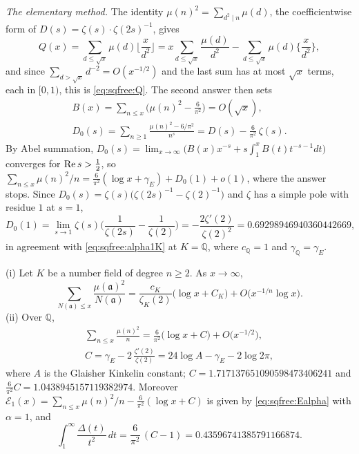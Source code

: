\emph{The elementary method.} The identity $\mu(n)^2=\sum_{d^2\mid n}\mu(d)$, the coefficientwise form of $D(s)=\zeta(s)\cdot\zeta(2s)^{-1}$, gives
\begin{equation}\label{eq:sqfree:Qd}
Q(x)=\sum_{d\le\sqrt x}\mu(d)\Big\lfloor\frac x{d^2}\Big\rfloor=x\sum_{d\le\sqrt x}\frac{\mu(d)}{d^2}-\sum_{d\le\sqrt x}\mu(d)\Big\{\frac x{d^2}\Big\},
\end{equation}
and since $\sum_{d>\sqrt x}d^{-2}=O(x^{-1/2})$ and the last sum has at most $\sqrt x$ terms, each in $[0,1)$, this is \eqref{eq:sqfree:Q}. The second answer then sets
\begin{gather*}
B(x)=\sum_{n\le x}\Big(\mu(n)^2-\frac6{\pi^2}\Big)=O(\sqrt x),\\
D_0(s)=\sum_{n\ge1}\frac{\mu(n)^2-6/\pi^2}{n^s}=D(s)-\frac6{\pi^2}\,\zeta(s).
\end{gather*}
By Abel summation, $D_0(s)=\lim_{x\to\infty}\big(B(x)x^{-s}+s\int_1^xB(t)t^{-s-1}dt\big)$ converges for $\operatorname{Re} s>\frac12$, so $\sum_{n\le x}\mu(n)^2/n=\frac6{\pi^2}(\log x+\gamma_E)+D_0(1)+o(1)$, where the answer stops. Since $D_0(s)=\zeta(s)\big(\zeta(2s)^{-1}-\zeta(2)^{-1}\big)$ and $\zeta$ has a simple pole with residue $1$ at $s=1$,
\[
D_0(1)=\lim_{s\to1}\zeta(s)\Big(\frac1{\zeta(2s)}-\frac1{\zeta(2)}\Big)=-\frac{2\zeta'(2)}{\zeta(2)^2}=0.69298946940360442669,
\]
in agreement with \eqref{eq:sqfree:alpha1K} at $K=\mathbb Q$, where $c_{\mathbb Q}=1$ and $\gamma_{\mathbb Q}=\gamma_E$.

\begin{proposition}\label{prop:sqfree:alpha1}
\textup{(i)} Let $K$ be a number field of degree $n\ge2$. As $x\to\infty$,
\[
\sum_{N(\mathfrak a)\le x}\frac{\mu(\mathfrak a)^2}{N(\mathfrak a)}=\frac{c_K}{\zeta_K(2)}\big(\log x+C_K\big)+O\big(x^{-1/n}\log x\big).
\]
\textup{(ii)} Over $\mathbb Q$,
\begin{equation}\label{eq:sqfree:alpha1}
\begin{gathered}
\sum_{n\le x}\frac{\mu(n)^2}n=\frac6{\pi^2}\big(\log x+C\big)+O\big(x^{-1/2}\big),\\
C=\gamma_E-2\,\frac{\zeta'(2)}{\zeta(2)}=24\log A-\gamma_E-2\log2\pi,
\end{gathered}
\end{equation}
where $A$ is the Glaisher Kinkelin constant; $C=1.717137651090598473406241$ and $\frac6{\pi^2}C=1.0438945157119382974$. Moreover $\mathcal E_1(x)=\sum_{n\le x}\mu(n)^2/n-\frac6{\pi^2}(\log x+C)$ is given by \eqref{eq:sqfree:Ealpha} with $\alpha=1$, and
\[
\int_1^\infty\frac{\Delta(t)}{t^2}\,dt=\frac6{\pi^2}\,(C-1)=0.43596741385791166874 .
\]
\end{proposition}

